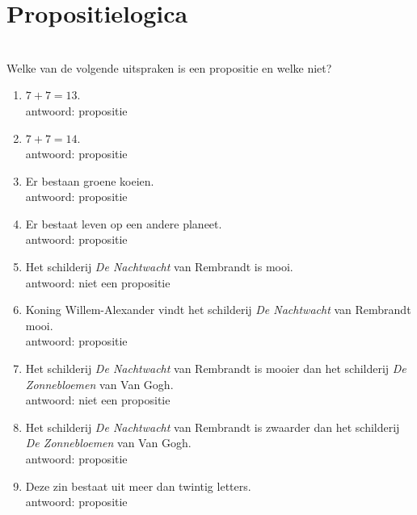 \section{Propositielogica}

\begin{answer}[Proposities]\mbox{}\\%
Welke van de volgende uitspraken is een propositie en welke niet?
\begin{enumerate}[label=\textit{\alph*.}]
\item $7+7 = 13$. \\
antwoord: propositie
\item $7+7 = 14$.\\
antwoord: propositie
\item Er bestaan groene koeien. \\
antwoord: propositie
\item Er bestaat leven op een andere planeet.\\
antwoord: propositie
\item Het schilderij \textit{De Nachtwacht} van Rembrandt is mooi.\\
antwoord: niet een propositie
\item Koning Willem-Alexander vindt het schilderij \textit{De Nachtwacht} van Rembrandt mooi.\\
antwoord: propositie
\item Het schilderij \textit{De Nachtwacht} van Rembrandt is mooier dan het schilderij \textit{De Zonnebloemen} van Van Gogh.\\
antwoord: niet een propositie
\item Het schilderij \textit{De Nachtwacht} van Rembrandt is zwaarder dan het schilderij \textit{De Zonnebloemen} van Van Gogh.\\
antwoord: propositie
\item Deze zin bestaat uit meer dan twintig letters.\\
antwoord: propositie
\end{enumerate}

\end{answer}

